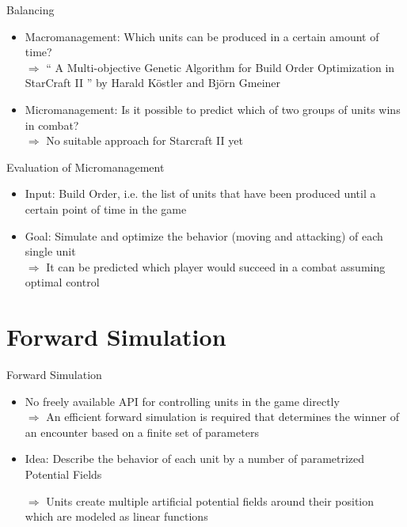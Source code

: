 \documentclass{beamer}
\begin{document}
\begin{frame}{Balancing}
\begin{itemize}
\item \alert{Macromanagement:} Which units can be produced in a certain amount of time?
\\ $\Rightarrow$ `` A Multi-objective Genetic Algorithm for Build Order Optimization in StarCraft II '' by Harald Köstler and Björn Gmeiner
\item \alert{Micromanagement:} Is it possible to predict which of two groups of units wins in combat?
\\ $\Rightarrow$ No suitable approach for Starcraft II yet
\end{itemize}
\end{frame}

\begin{frame}{Evaluation of Micromanagement}
\begin{itemize}
\item \alert{Input:} Build Order, i.e. the list of units that have been produced until a certain point of time in the game
\item \alert{Goal:} Simulate and optimize the behavior (moving and attacking) of each single unit
\\ $\Rightarrow$ It can be predicted which player would succeed in a combat assuming optimal control
\end{itemize}
\end{frame}

\section{Forward Simulation}
\begin{frame}{Forward Simulation}
    \begin{itemize}
\item No freely available API for controlling units in the game directly
\\ $\Rightarrow$ An efficient forward simulation is required that determines the winner of an encounter based on a finite set of parameters
\item \alert{Idea:} Describe the behavior of each unit by a number of parametrized \alert{Potential Fields}
\item[$\Rightarrow$] Units create multiple artificial potential fields around their position which are modeled as linear functions
\end{itemize}
\end{frame}
\end{document}
